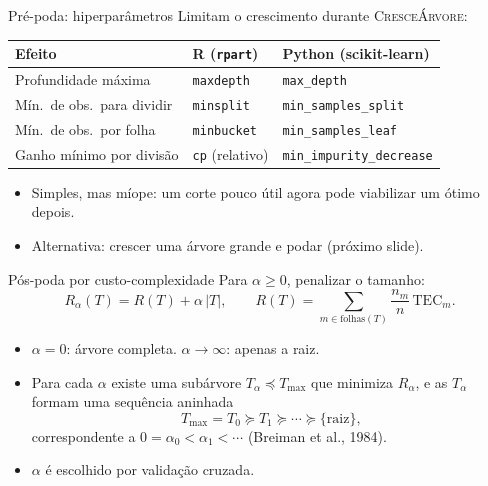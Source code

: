 \documentclass[aspectratio=169]{beamer}
\newcommand{\TEC}{\mathrm{TEC}}
\begin{document}
\begin{frame}{Pré-poda: hiperparâmetros}
Limitam o crescimento \alert{durante} \textsc{CresceÁrvore}:

\vspace{6pt}
\centering
\small
\begin{tabular}{p{}p{}p{}}
\toprule
\textbf{Efeito} & \textbf{R (\texttt{rpart})} & \textbf{Python (scikit-learn)}\\
\midrule
Profundidade máxima & \texttt{maxdepth} & \texttt{max\_depth}\\
Mín.\ de obs.\ para dividir & \texttt{minsplit} & \texttt{min\_samples\_split}\\
Mín.\ de obs.\ por folha & \texttt{minbucket} & \texttt{min\_samples\_leaf}\\
Ganho mínimo por divisão & \texttt{cp} (relativo) & \texttt{min\_impurity\_decrease}\\
\bottomrule
\end{tabular}

\vspace{8pt}
\raggedright
\begin{itemize}
  \item Simples, mas míope: um corte pouco útil agora pode viabilizar um ótimo depois.
  \item Alternativa: crescer uma árvore grande e \alert{podar} (próximo slide).
\end{itemize}
\end{frame}

\begin{frame}{Pós-poda por custo-complexidade}
Para $\alpha\ge0$, penalizar o tamanho:
\[
R_\alpha(T)=R(T)+\alpha\,|T|,\qquad R(T)=\sum_{m\in\text{folhas}(T)}\frac{n_m}{n}\,\TEC_m .
\]
\begin{itemize}
  \item $\alpha=0$: árvore completa. $\alpha\to\infty$: apenas a raiz.
  \item Para cada $\alpha$ existe uma subárvore $T_\alpha\preceq T_{\max}$ que minimiza $R_\alpha$, e as $T_\alpha$ formam uma sequência \alert{aninhada}
  \[
  T_{\max}=T_0\succeq T_1\succeq\cdots\succeq\{\text{raiz}\},
  \]
  correspondente a $0=\alpha_0<\alpha_1<\cdots$ (Breiman et al., 1984).
  \item $\alpha$ é escolhido por validação cruzada.
\end{itemize}
\end{frame}
\end{document}
